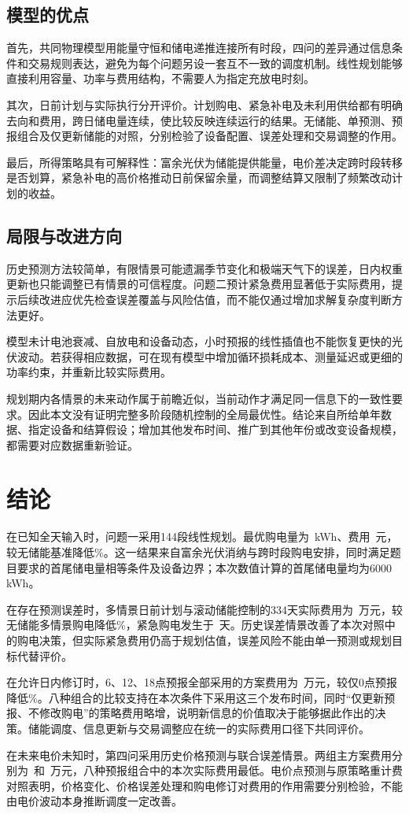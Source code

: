 \subsection{模型的优点}
首先，共同物理模型用能量守恒和储电递推连接所有时段，四问的差异通过信息条件和交易规则表达，避免为每个问题另设一套互不一致的调度机制。线性规划能够直接利用容量、功率与费用结构，不需要人为指定充放电时刻。

其次，日前计划与实际执行分开评价。计划购电、紧急补电及未利用供给都有明确去向和费用，跨日储电量连续，使比较反映连续运行的结果。无储能、单预测、预报组合及仅更新储能的对照，分别检验了设备配置、误差处理和交易调整的作用。

最后，所得策略具有可解释性：富余光伏为储能提供能量，电价差决定跨时段转移是否划算，紧急补电的高价格推动日前保留余量，而调整结算又限制了频繁改动计划的收益。

\subsection{局限与改进方向}
历史预测方法较简单，有限情景可能遗漏季节变化和极端天气下的误差，日内权重更新也只能调整已有情景的可信程度。问题二预计紧急费用显著低于实际费用，提示后续改进应优先检查误差覆盖与风险估值，而不能仅通过增加求解复杂度判断方法更好。

模型未计电池衰减、自放电和设备动态，小时预报的线性插值也不能恢复更快的光伏波动。若获得相应数据，可在现有模型中增加循环损耗成本、测量延迟或更细的功率约束，并重新比较实际费用。

规划期内各情景的未来动作属于前瞻近似，当前动作才满足同一信息下的一致性要求。因此本文没有证明完整多阶段随机控制的全局最优性。结论来自所给单年数据、指定设备和结算假设；增加其他发布时间、推广到其他年份或改变设备规模，都需要对应数据重新验证。

\section{结论}
在已知全天输入时，问题一采用144段线性规划。最优购电量为\QoneGrid\ kWh、费用\QoneCost\ 元，较无储能基准降低\SavingPercent\%。这一结果来自富余光伏消纳与跨时段购电安排，同时满足题目要求的首尾储电量相等条件及设备边界；本次数值计算的首尾储电量均为6000 kWh。

在存在预测误差时，多情景日前计划与滚动储能控制的334天实际费用为\QtwoCost\ 万元，较无储能多情景购电降低\QtwoNoStorageSaving\%，紧急购电发生于\QtwoDays\ 天。历史误差情景改善了本次对照中的购电决策，但实际紧急费用仍高于规划估值，误差风险不能由单一预测或规划目标代替评价。

在允许日内修订时，6、12、18点预报全部采用的方案费用为\QthreeCost\ 万元，较仅0点预报降低\QthreeSaving\%。八种组合的比较支持在本次条件下采用这三个发布时间，同时“仅更新预报、不修改购电”的策略费用略增，说明新信息的价值取决于能够据此作出的决策。储能调度、信息更新与交易调整应在统一的实际费用口径下共同评价。

在未来电价未知时，第四问采用历史价格预测与联合误差情景。两组主方案费用分别为\QfourTwoCost\ 和\QfourThreeCost\ 万元，八种预报组合中\QfourBestName 的本次实际费用最低。电价点预测与原策略重计费对照表明，价格变化、价格误差处理和购电修订对费用的作用需要分别检验，不能由电价波动本身推断调度一定改善。
